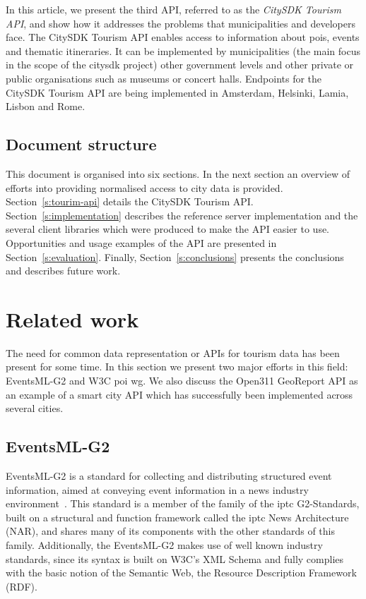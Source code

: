 \documentclass[times,doublespace]{ettauth}%
\begin{document}
In this article, we present the third API, referred to as the \emph{CitySDK Tourism API}, and show how it addresses the problems that municipalities and developers face. 
The CitySDK Tourism API enables access to information about \acp{poi}, events and thematic itineraries.
It can be implemented by municipalities (the main focus in the scope of the \ac{citysdk} project) other government levels and other private or public organisations such as museums or concert halls.
Endpoints for the CitySDK Tourism API are being implemented in Amsterdam, Helsinki, Lamia, Lisbon and Rome.

\subsection{Document structure}
\label{s:structure}
This document is organised into six sections.
In the next section an overview of efforts into providing normalised access to city data is provided.
Section~\ref{s:tourim-api} details the CitySDK Tourism API\@.
Section~\ref{s:implementation} describes the reference server implementation and the several client libraries which were produced to make the API easier to use.
Opportunities and usage examples of the API are presented in Section~\ref{s:evaluation}. 
Finally, Section~\ref{s:conclusions} presents the conclusions and describes future work.



\section{Related work}
\label{s:related-work}
The need for common data representation or APIs for tourism data has been present for some time.
In this section we present two major efforts in this field:  EventsML-G2 and \ac{W3C} \ac{poi} \ac{wg}.
We also discuss the Open311 GeoReport API as an example of a smart city API which has successfully been implemented across several cities.

\subsection{EventsML-G2}
EventsML-G2 is a standard for collecting and distributing structured event information, aimed at conveying event information in a news industry environment~\cite{eventsml}. 
This standard is a member of the family of the \ac{iptc} G2-Standards, built on a structural and function framework called the \ac{iptc} News Architecture (NAR), and shares many of its components with the other standards of this family. 
Additionally, the EventsML-G2 makes use of well known industry standards, since its syntax is built on W3C's XML Schema and fully complies with the basic notion of the Semantic Web, the Resource Description Framework (RDF).
\end{document}
